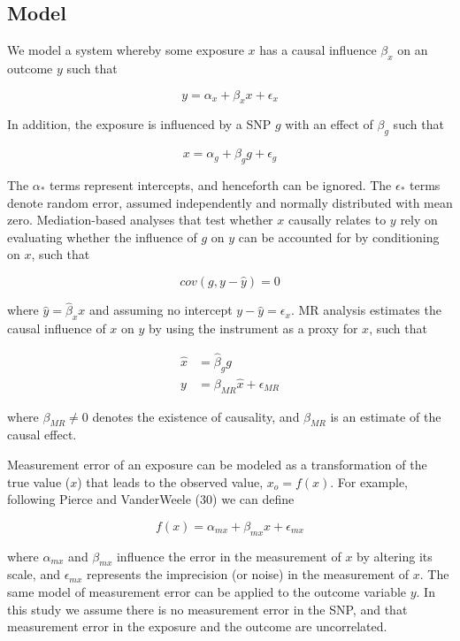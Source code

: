 \documentclass[]{article}
\begin{document}
\subsection{Model}\label{model}

We model a system whereby some exposure \(x\) has a causal influence
\(\beta_x\) on an outcome \(y\) such that

\[
y = \alpha_x + \beta_x x + \epsilon_x
\]

In addition, the exposure is influenced by a SNP \(g\) with an effect of
\(\beta_g\) such that

\[
x = \alpha_g + \beta_g g + \epsilon_g
\]

The \(\alpha_*\) terms represent intercepts, and henceforth can be
ignored. The \(\epsilon_*\) terms denote random error, assumed
independently and normally distributed with mean zero. Mediation-based
analyses that test whether \(x\) causally relates to \(y\) rely on
evaluating whether the influence of \(g\) on \(y\) can be accounted for
by conditioning on \(x\), such that

\[
cov(g, y - \hat{y}) = 0
\]

where \(\hat{y} = \hat{\beta}_x x\) and assuming no intercept
\(y - \hat{y} = \epsilon_x\). MR analysis estimates the causal influence
of \(x\) on \(y\) by using the instrument as a proxy for \(x\), such
that

\[
\begin{aligned}
\hat{x} & = \hat{\beta}_g g \\
y & = \beta_{MR}\hat{x} + \epsilon_{MR}
\end{aligned}
\]

where \(\beta_{MR} \neq 0\) denotes the existence of causality, and
\(\beta_{MR}\) is an estimate of the causal effect.

Measurement error of an exposure can be modeled as a transformation of
the true value (\(x\)) that leads to the observed value, \(x_o = f(x)\).
For example, following Pierce and VanderWeele (30) we can define

\[
f(x) = \alpha_{mx} + \beta_{mx} x + \epsilon_{mx}
\]

where \(\alpha_{mx}\) and \(\beta_{mx}\) influence the error in the
measurement of \(x\) by altering its scale, and \(\epsilon_{mx}\)
represents the imprecision (or noise) in the measurement of \(x\). The
same model of measurement error can be applied to the outcome variable
\(y\). In this study we assume there is no measurement error in the SNP,
and that measurement error in the exposure and the outcome are
uncorrelated.
\end{document}

